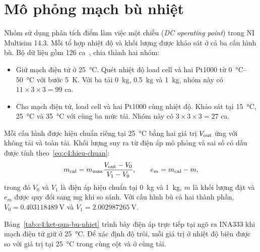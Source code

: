\section{Mô phỏng mạch bù nhiệt}
\label{sec:c4:mo-phong}

Nhóm sử dụng phân tích điểm làm việc một chiều
(\textit{DC operating point}) trong NI Multisim 14.3. Mỗi tổ hợp
nhiệt độ và khối lượng được khảo sát ở cả ba cấu hình bù. Bộ dữ liệu
gồm 126 ca~\cite{c4_ket_qua}, chia thành hai nhóm:
\begin{itemize}
    \item Giữ mạch điện tử ở \qty{25}{\celsius}. Quét nhiệt độ load cell
    và hai Pt1000 từ \qtyrange{0}{50}{\celsius} với bước \qty{5}{\kelvin}.
    Với ba tải \qty{0}{\kilo\gram}, \qty{0.5}{\kilo\gram} và
    \qty{1}{\kilo\gram}, nhóm này có $11\times3\times3=99$ ca.
    \item Cho mạch điện tử, load cell và hai Pt1000 cùng nhiệt độ.
    Khảo sát tại \qty{15}{\celsius}, \qty{25}{\celsius} và
    \qty{35}{\celsius} với cùng ba mức tải. Nhóm này có
    $3\times3\times3=27$ ca.
\end{itemize}

Mỗi cấu hình được hiệu chuẩn riêng tại \qty{25}{\celsius} bằng hai
giá trị $V_{\mathrm{out}}$ ứng với không tải và toàn tải. Khối lượng suy ra từ
điện áp mô phỏng và sai số có dấu được tính
theo~\eqref{eq:c4:hieu-chuan}:
\begin{equation}
    m_{\mathrm{cal}}
    =m_{\max}\frac{V_{\mathrm{out}}-V_0}{V_1-V_0},
    \qquad e_m=m_{\mathrm{cal}}-m,
    \label{eq:c4:hieu-chuan}
\end{equation}
trong đó $V_0$ và $V_1$ là điện áp hiệu chuẩn tại \qty{0}{\kilo\gram}
và \qty{1}{\kilo\gram}, $m$ là khối lượng đặt và $e_m$ được quy đổi
sang \unit{\milli\gram} khi so sánh. Với cấu hình bù cả hai thành phần,
$V_0=\qty{0.403118489}{\volt}$ và $V_1=\qty{2.002987265}{\volt}$.

Bảng~\ref{tab:c4:ket-qua-bu-nhiet} trình bày điện áp trực tiếp tại
ngõ ra INA333 khi mạch điện tử giữ ở \qty{25}{\celsius}.
Để xác định độ trôi, mỗi giá trị ở nhiệt độ biên được so với giá trị
tại \qty{25}{\celsius} trong cùng cột và ở cùng tải.

